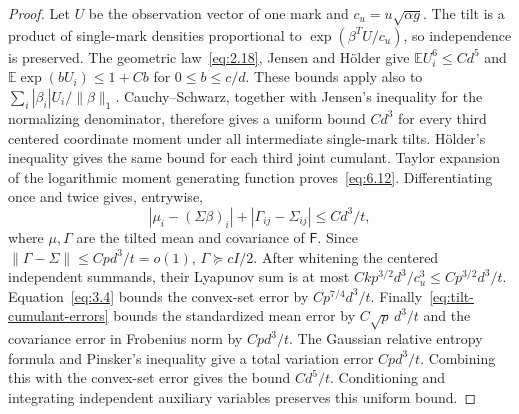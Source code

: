 \documentclass[11pt,a4paper]{article}
\numberwithin{equation}{section}
\theoremstyle{remark}
\begin{document}
\begin{proof}
Let $U$ be the observation vector of one mark and $c_u=u\sqrt{\alpha g}$.
The tilt is a product of single-mark densities proportional to
$\exp(\beta^TU/c_u)$, so independence is preserved. The geometric law~\eqref{eq:2.18}, Jensen and H\"older give
$\mathbb E U_i^6\le Cd^5$ and
$\mathbb E\exp(bU_i)\le1+Cb$ for $0\le b\le c/d$.
These bounds apply also to $\sum_i|\beta_i|U_i/\|\beta\|_1$.
Cauchy--Schwarz, together with Jensen's inequality for the normalizing denominator, therefore gives a uniform bound $Cd^3$ for every third centered coordinate moment under all intermediate single-mark tilts. H\"older's inequality gives the same bound for each third joint cumulant. Taylor expansion of the logarithmic moment generating function proves~\eqref{eq:6.12}. Differentiating once and twice gives, entrywise,
\begin{equation}\label{eq:tilt-cumulant-errors}
|\mu_i-(\Sigma\beta)_i|+|\Gamma_{ij}-\Sigma_{ij}|
\le Cd^3/t,
\end{equation}
where $\mu,\Gamma$ are the tilted mean and covariance of $\mathsf F$.
Since $\|\Gamma-\Sigma\|\le Cpd^3/t=o(1)$, $\Gamma\succeq cI/2$.
After whitening the centered independent summands, their Lyapunov sum is at most
$Ckp^{3/2}d^3/c_u^3\le Cp^{3/2}d^3/t$.
Equation~\eqref{eq:3.4} bounds the convex-set error by
$Cp^{7/4}d^3/t$.
Finally~\eqref{eq:tilt-cumulant-errors} bounds the standardized mean error by
$C\sqrt p\,d^3/t$ and the covariance error in Frobenius norm by $Cpd^3/t$.
The Gaussian relative entropy formula and Pinsker's inequality give a total variation error $Cpd^3/t$. Combining this with the convex-set error gives the bound $Cd^5/t$.
Conditioning and integrating independent auxiliary variables preserves this uniform bound.
\end{proof}
\end{document}
